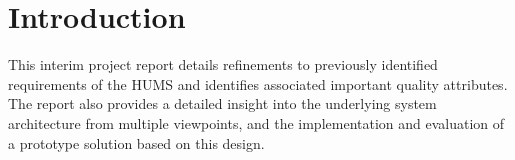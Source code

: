\section{Introduction}
\label{sec:introduction}

This interim project report details refinements to previously identified requirements of the HUMS and identifies associated important quality attributes. The report also provides a detailed insight into the underlying system architecture from multiple viewpoints, and the implementation and evaluation of a prototype solution based on this design.
